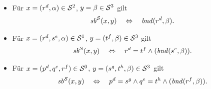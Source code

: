 

\begin{dfn}[$\Gsb^\einf$]\ 
    \begin{itemize}
        \item Für $x = (r^d, \alpha) \in \mathcal{S}^2$, $y = \beta \in \mathcal{S}^3$ gilt
            \begin{align*}
                \mathit{sb}^{\mathcal{S}}(x,y) 
                \quad \Leftrightarrow \quad 
                \mathit{bnd}(r^d,\beta).
            \end{align*}
        \item Für $x = (r^d,s^e,\alpha) \in \mathcal{S}^1$, $y = (t^f, \beta) \in \mathcal{S}^3$ gilt
            \begin{align*}
                \mathit{sb}^{\mathcal{S}}(x,y) 
                \quad \Leftrightarrow \quad 
                r^d = t^f \land ( \mathit{bnd}(s^e,\beta) ).
            \end{align*}
        \item Für $x = (p^d,q^e,r^f) \in \mathcal{S}^0$, $y = (s^g, t^h, \beta) \in \mathcal{S}^3$ gilt
            \begin{align*}
                \mathit{sb}^{\mathcal{S}}(x,y) 
                \quad \Leftrightarrow \quad 
                p^d = s^g \land q^e = t^h \land ( \mathit{bnd}(r^f,\beta)).
            \end{align*}
    \end{itemize}
\end{dfn}


